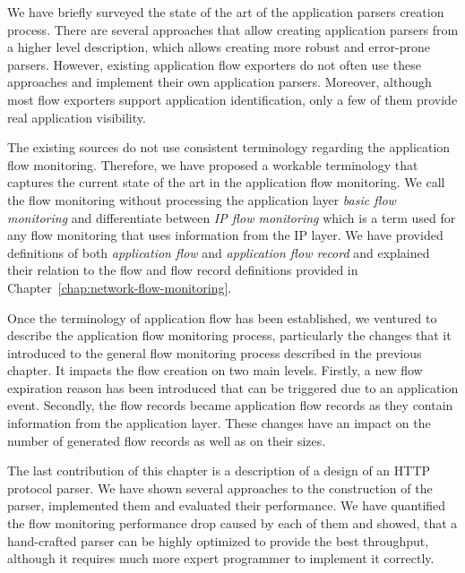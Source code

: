 We have briefly surveyed the state of the art of the application parsers creation process. There are several approaches that allow creating application parsers from a higher level description, which allows creating more robust and error-prone parsers. However, existing application flow exporters do not often use these approaches and implement their own application parsers. Moreover, although most flow exporters support application identification, only a few of them provide real application visibility. 

The existing sources do not use consistent terminology regarding the application flow monitoring. Therefore, we have proposed a workable terminology that captures the current state of the art in the application flow monitoring. We call the flow monitoring without processing the application layer \emph{basic flow monitoring} and differentiate between \emph{IP flow monitoring} which is a term used for any flow monitoring that uses information from the IP layer. We have provided definitions of both \emph{application flow} and \emph{application flow record} and explained their relation to the flow and flow record definitions provided in Chapter~\ref{chap:network-flow-monitoring}.

Once the terminology of application flow has been established, we ventured to describe the application flow monitoring process, particularly the changes that it introduced to the general flow monitoring process described in the previous chapter. It impacts the flow creation on two main levels. Firstly, a new flow expiration reason has been introduced that can be triggered due to an application event. Secondly, the flow records became application flow records as they contain information from the application layer. These changes have an impact on the number of generated flow records as well as on their sizes.

The last contribution of this chapter is a description of a design of an HTTP protocol parser. We have shown several approaches to the construction of the parser, implemented them and evaluated their performance. We have quantified the flow monitoring performance drop caused by each of them and showed, that a hand-crafted parser can be highly optimized to provide the best throughput, although it requires much more expert programmer to implement it correctly.


